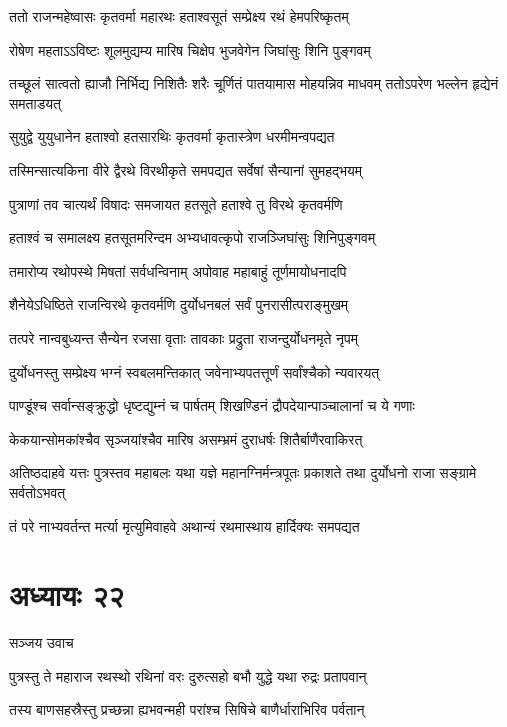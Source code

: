 \twolineshloka
{ततो राजन्महेष्वासः कृतवर्मा महारथः}
{हताश्वसूतं सम्प्रेक्ष्य रथं हेमपरिष्कृतम्}


\twolineshloka
{रोषेण महताऽऽविष्टः शूलमुद्यम्य मारिष}
{चिक्षेप भुजवेगेन जिघांसुः शिनि पुङ्गवम्}


\threelineshloka
{तच्छूलं सात्वतो ह्याजौ निर्भिद्य निशितैः शरैः}
{चूर्णितं पातयामास मोहयन्निव माधवम्}
{ततोऽपरेण भल्लेन हृद्येनं समताडयत्}


\twolineshloka
{सुयुद्वे युयुधानेन हताश्वो हतसारथिः}
{कृतवर्मा कृतास्त्रेण धरमीमन्वपद्यत}


\twolineshloka
{तस्मिन्सात्यकिना वीरे द्वैरथे विरथीकृते}
{समपद्यत सर्वेषां सैन्यानां सुमहद्भयम्}


\twolineshloka
{पुत्राणां तव चात्यर्थं विषादः समजायत}
{हतसूते हताश्वे तु विरथे कृतवर्मणि}


\twolineshloka
{हताश्वं च समालक्ष्य हतसूतमरिन्दम}
{अभ्यधावत्कृपो राजञ्जिघांसुः शिनिपुङ्गवम्}


\twolineshloka
{तमारोप्य रथोपस्थे मिषतां सर्वधन्विनाम्}
{अपोवाह महाबाहुं तूर्णमायोधनादपि}


\twolineshloka
{शैनेयेऽधिष्ठिते राजन्विरथे कृतवर्मणि}
{दुर्योधनबलं सर्वं पुनरासीत्पराङ्मुखम्}


\twolineshloka
{तत्परे नान्वबुध्यन्त सैन्येन रजसा वृताः}
{तावकाः प्रद्रुता राजन्दुर्योधनमृते नृपम्}


\twolineshloka
{दुर्योधनस्तु सम्प्रेक्ष्य भग्नं स्वबलमन्तिकात्}
{जवेनाभ्यपतत्तूर्णं सर्वांश्चैको न्यवारयत्}


\twolineshloka
{पाण्डूंश्च सर्वान्सङ्क्रुद्धो धृष्टद्युम्नं च पार्षतम्}
{शिखण्डिनं द्रौपदेयान्पाञ्चालानां च ये गणाः}


\twolineshloka
{केकयान्सोमकांश्चैव सृञ्जयांश्चैव मारिष}
{असम्भ्रमं दुराधर्षः शितैर्बाणैरवाकिरत्}


\threelineshloka
{अतिष्ठदाहवे यत्तः पुत्रस्तव महाबलः}
{यथा यज्ञे महानग्निर्मन्त्रपूतः प्रकाशते}
{तथा दुर्योधनो राजा सङ्ग्रामे सर्वतोऽभवत्}


\twolineshloka
{तं परे नाभ्यवर्तन्त मर्त्या मृत्युमिवाहवे}
{अथान्यं रथमास्थाय हार्दिक्यः समपद्यत}


\chapter{अध्यायः २२}
\twolineshloka
{सञ्जय उवाच}
{}


\twolineshloka
{पुत्रस्तु ते महाराज रथस्थो रथिनां वरः}
{दुरुत्सहो बभौ युद्धे यथा रुद्रः प्रतापवान्}


\twolineshloka
{तस्य बाणसहस्रैस्तु प्रच्छन्ना ह्यभवन्मही}
{परांश्च सिषिचे बाणैर्धाराभिरिव पर्वतान्}


